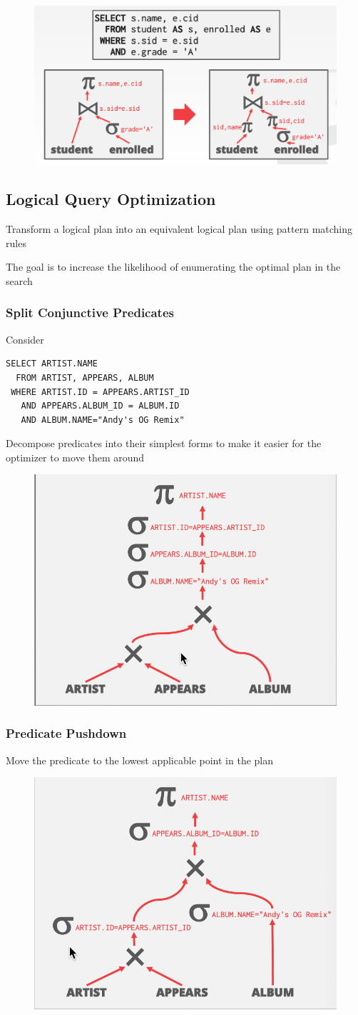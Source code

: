 \documentclass[11pt]{article}
\begin{document}
\begin{figure}[htbp]
\centering
\includegraphics[width=.5\textwidth]{../images/15445/38.png}
\label{}
\end{figure}
\subsection{Logical Query Optimization}
\label{sec:org32c2d3e}
Transform a logical plan into an equivalent logical plan using pattern matching rules

The goal is to increase the likelihood of enumerating the optimal plan in the search
\subsubsection{Split Conjunctive Predicates}
\label{sec:orge701206}
Consider
\begin{verbatim}
SELECT ARTIST.NAME
  FROM ARTIST, APPEARS, ALBUM
 WHERE ARTIST.ID = APPEARS.ARTIST_ID
   AND APPEARS.ALBUM_ID = ALBUM.ID
   AND ALBUM.NAME="Andy's OG Remix"
\end{verbatim}

Decompose predicates into their simplest forms to make it easier for the optimizer to move them
around
\begin{figure}[htbp]
\centering
\includegraphics[width=.4\textwidth]{../images/15445/39.png}
\label{}
\end{figure}
\subsubsection{Predicate Pushdown}
\label{sec:org7822df4}
Move the predicate to the lowest applicable point in the plan
\begin{figure}[htbp]
\centering
\includegraphics[width=.5\textwidth]{../images/15445/40.png}
\label{}
\end{figure}
\end{document}

